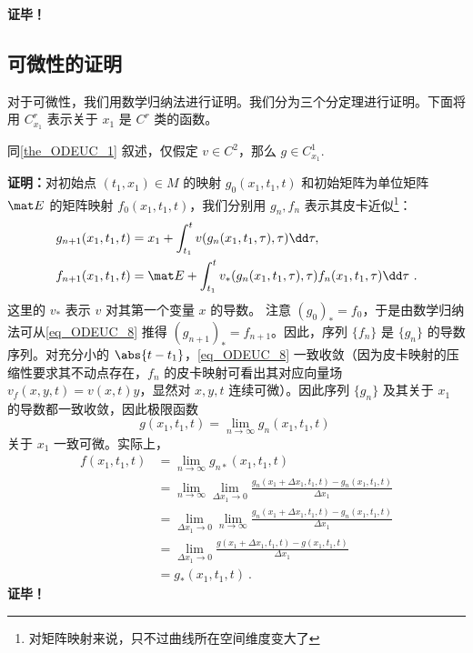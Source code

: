 \textbf{证毕！}

\subsection{可微性的证明}
对于可微性，我们用数学归纳法进行证明。我们分为三个分定理进行证明。下面将用 $C_{x_1}^r$ 表示关于 ${x_1}$ 是 $C^r$ 类的函数。
\begin{theorem}{}
同\autoref{the_ODEUC_1} 叙述，仅假定 $v\in C^2$，那么 $g\in C_{x_1}^1$.
\end{theorem}
\textbf{证明：}对初始点 $(t_1,x_1)\in M$ 的映射 $g_0(x_1,t_1,t)$ 和初始矩阵为单位矩阵 $\mat E$ 的矩阵映射 $f_0(x_1,t_1,t)$，我们分别用 $g_n,f_n$ 表示其皮卡近似\footnote{对矩阵映射来说，只不过曲线所在空间维度变大了}：
\begin{equation}\label{eq_ODEUC_8}
\begin{aligned}
g_{n+1}(x_1,t_1,t)&=x_1+\int_{t_1}^{t}v(g_n(x_1,t_1,\tau),\tau)\dd\tau,\\
f_{n+1}(x_1,t_1,t)&=\mat E+\int_{t_1}^{t}v_{*}(g_n(x_1,t_1,\tau),\tau)f_n(x_1,t_1,\tau)\dd\tau~.
\end{aligned}
\end{equation}
这里的 $v_{*}$ 表示 $v$ 对其第一个变量 $x$ 的导数。
注意 $(g_{0})_{*}=f_0$，于是由数学归纳法可从\autoref{eq_ODEUC_8} 推得 $(g_{n+1})_{*}=f_{n+1}$。因此，序列 $\{f_n\}$ 是 $\{g_n\}$ 的导数序列。对充分小的 $\abs{t-t_1}$，\autoref{eq_ODEUC_8} 一致收敛（因为皮卡映射的压缩性要求其不动点存在，$f_n$ 的皮卡映射可看出其对应向量场 $v_f(x,y,t)=v(x,t)y$，显然对 $x,y,t$ 连续可微）。因此序列 $\{g_n\}$ 及其关于 $x_1$ 的导数都一致收敛，因此极限函数
\begin{equation}
g(x_1,t_1,t)=\lim_{n\rightarrow\infty}g_n(x_1,t_1,t)~
\end{equation}
关于 $x_1$ 一致可微。实际上，
\begin{equation}\label{eq_ODEUC_10}
\begin{aligned}
f(x_1,t_1,t)&=\lim_{n\rightarrow\infty}g_{n*}(x_1,t_1,t)\\
&=\lim\limits_{n\rightarrow\infty}\lim\limits_{\Delta x_1\rightarrow0}\frac{g_{n}(x_1+\Delta x_1,t_1,t)-g_{n}(x_1,t_1,t)}{\Delta x_1}\\
&=\lim\limits_{\Delta x_1\rightarrow0}\lim\limits_{n\rightarrow\infty}\frac{g_{n}(x_1+\Delta x_1,t_1,t)-g_{n}(x_1,t_1,t)}{\Delta x_1}\\
&=\lim\limits_{\Delta x_1\rightarrow0}\frac{g(x_1+\Delta x_1,t_1,t)-g(x_1,t_1,t)}{\Delta x_1}\\
&=g_*(x_1,t_1,t)~.
\end{aligned}
\end{equation}
\textbf{证毕！}

